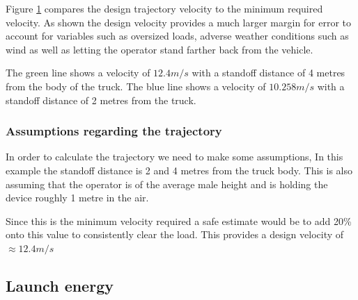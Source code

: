 \documentclass[a4paper,10pt]{article} %
\begin{document}
\begin{figure}[htbp!]
\label{fig:trajectory}
\end{figure}

\noindent Figure \ref{fig:trajectory} compares the design trajectory velocity to the minimum required velocity. As shown the design velocity provides a much larger margin for error to account for variables such as oversized loads, adverse weather conditions such as wind as well as letting the operator stand farther back from the vehicle. 

\medskip

The green line shows a velocity of $12.4m/s$ with a standoff distance of 4 metres from the body of the truck. The blue line shows a velocity of $10.258m/s$ with a standoff distance of 2 metres from the truck. 

\subsubsection{Assumptions regarding the trajectory}

In order to calculate the trajectory we need to make some assumptions, In this example the standoff distance is 2 and 4 metres from the truck body. This is also assuming that the operator is of the average male height and is holding the device roughly 1 metre in the air.

\medskip

Since this is the minimum velocity required a safe estimate would be to add 20\% onto this value to consistently clear the load. This provides a design velocity of \textbf{$\approx 12.4m/s$}

\newpage

\subsection{Launch energy}
\end{document}
